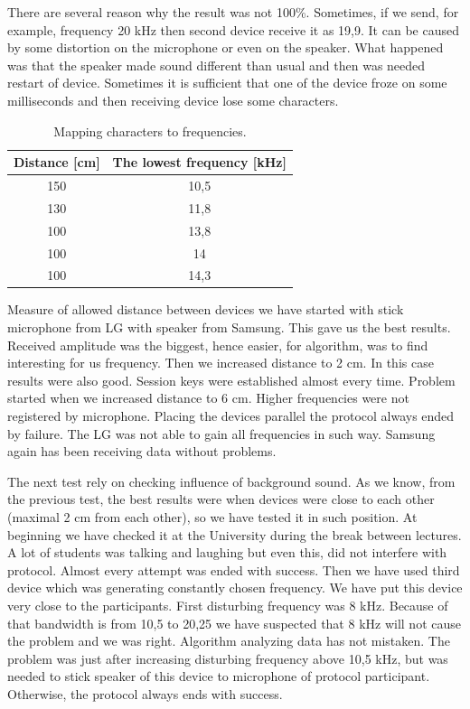 \documentclass[11pt,titlepage]{article}
\theoremstyle{plain}
\begin{document}
\vspace{5mm}

There are several reason why the result was not 100\%. Sometimes, if we send, for example, frequency 20 kHz then second device receive it as 19,9. It can be caused by some distortion on the microphone or even on the speaker. What happened was that the speaker made sound different than usual and then was needed restart of device. Sometimes it is sufficient that one of the device froze on some milliseconds and then receiving device lose some characters. 

\vspace{5mm}

\begin{table}[H]
	\centering
	\begin{tabular}{| c | c |}
		\hline
		Distance [cm] & The lowest frequency [kHz] \\
		\hline
		150 & 10,5 \\
		\hline
		130 & 11,8 \\
		\hline
		100 & 13,8 \\
		\hline
		100 & 14   \\
		\hline
		100 & 14,3 \\
		\hline
	\end{tabular}
	\caption{Mapping characters to frequencies.}
\end{table}

Measure of allowed distance between devices we have started with stick microphone from LG with speaker from Samsung. This gave us the best results. Received amplitude was the biggest, hence easier, for algorithm, was to find interesting for us frequency. Then we increased distance to 2 cm. In this case results were also good. Session keys were established almost every time. Problem started when we increased distance to 6 cm. Higher frequencies were not registered by microphone. Placing the devices parallel the protocol always ended by failure. The LG was not able to gain all frequencies in such way. Samsung again has been receiving data without problems. 

\vspace{5mm}

The next test rely on checking influence of background sound. As we know, from the previous test, the best results were when devices were close to each other (maximal 2 cm from each other), so we have tested it in such position. At beginning we have checked it at the University during the break between lectures. A lot of students was talking and laughing but even this, did not interfere with protocol. Almost every attempt was ended with success. Then we have used third device which was generating constantly chosen frequency. We have put this device very close to the participants. First disturbing frequency was 8 kHz. Because of that bandwidth is from 10,5 to 20,25 we have suspected that 8 kHz will not cause the problem and we was right. Algorithm analyzing data has not mistaken. The problem was just after increasing disturbing frequency above 10,5 kHz, but was needed to stick speaker of this device to microphone of protocol participant. Otherwise, the protocol always ends with success. 
\end{document}

